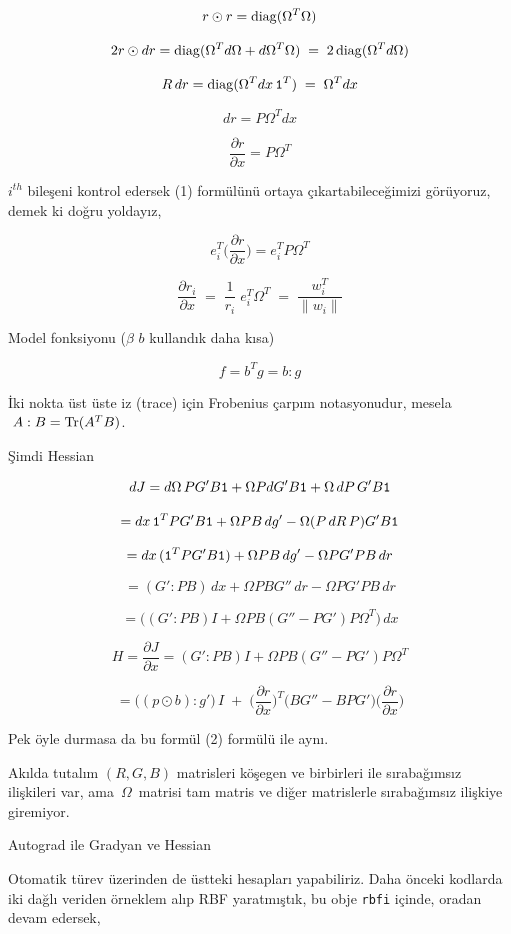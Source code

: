\documentclass[12pt,fleqn]{article}\usepackage{../../common}
\begin{document}
$$
r\odot r = {\rm diag}(\Omega^T\Omega) 
$$

$$
2r\odot dr = {\rm diag}(\Omega^Td\Omega+d\Omega^T\Omega)
\;=\; 2{\,\rm {diag}}(\Omega^Td\Omega) 
$$

$$
R\,dr = {\rm diag}(\Omega^Tdx\,{\tt\large 1}^T) \;=\; \Omega^Tdx 
$$

$$
dr = P\Omega^Tdx 
$$

$$
\frac{\partial r}{\partial x} = P\Omega^T 
$$

$i^{th}$ bileşeni kontrol edersek (1) formülünü ortaya çıkartabileceğimizi
görüyoruz, demek ki doğru yoldayız,

$$
e_i^T\bigg(\frac{\partial r}{\partial x}\bigg) = e_i^TP\Omega^T 
$$

$$
\frac{\partial r_i}{\partial x} 
\;=\; \frac{1}{r_i}\;e_i^T\Omega^T
\;=\; \frac{w_i^T}{\|w_i\|} 
$$

Model fonksiyonu ($\beta$ $b$ kullandık daha kısa) 

$$f = b^Tg = b:g$$

İki nokta üst üste iz (trace) için Frobenius çarpım notasyonudur, mesela
$\;A:B = {\rm Tr}(A^TB)$. 

Şimdi Hessian

$$
dJ = d\Omega\,PG'B{\tt\large 1} + \Omega PdG'B{\tt\large 1} + \Omega\,dP\,G'B{\tt\large 1} 
$$

$$
= dx\,{\tt\large 1}^TPG'B{\tt\large 1} + \Omega PB\,dg' - \Omega (P\,dR\,P)G'B{\tt\large 1}
$$

$$
 = dx\,({\tt\large 1}^TPG'B{\tt\large 1}) +\Omega PB\,dg' -\Omega PG'PB\,dr
$$

$$
 = (G':PB)\,dx +\Omega PBG''\,dr -\Omega PG'PB\,dr
$$

$$
 = \Big((G':PB)I +\Omega PB(G'' - PG')P\Omega^T\Big)\,dx
$$

$$
H = \frac{\partial J}{\partial x}
 = (G':PB)I + \Omega PB(G''-PG')P\Omega^T
$$

$$
= \Big((p\odot b):g'\Big)\,I \;+\; 
\bigg(\frac{\partial r}{\partial x}\bigg)^T\Big(BG''-BPG'\Big)\bigg(\frac{\partial r}{\partial x}\bigg) 
$$

Pek öyle durmasa da bu formül (2) formülü ile aynı.

Akılda tutalım $(R,G,B)$ matrisleri köşegen ve birbirleri ile sırabağımsız
ilişkileri var, ama $\,\Omega\,$ matrisi tam matris ve diğer matrislerle
sırabağımsız ilişkiye giremiyor.

Autograd ile Gradyan ve Hessian

Otomatik türev üzerinden de üstteki hesapları yapabiliriz. Daha önceki
kodlarda iki dağlı veriden örneklem alıp RBF yaratmıştık, bu obje
\verb!rbfi! içinde, oradan devam edersek,
\end{document}
